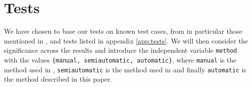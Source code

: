 \documentclass[10pt,letterpaper,final]{article}
\begin{document}








\section{Tests}
We have chosen to base our tests on known test cases, from in particular
those mentioned in \cite{jensenandersen}, \cite{googlingdiagnosis} and
tests listed in appendix \ref{app:tests}. We will then consider the
significance across the results and introduce the independent variable
\texttt{method} with the values \texttt{\{manual, semiautomatic,
automatic\}}, where \texttt{manual} is the method used in
\cite{googlingdiagnosis}, \texttt{semiautomatic} is the method used in
\cite{jensenandersen} and finally \texttt{automatic} is the method
described in this paper.
\end{document}
